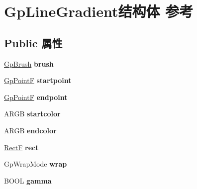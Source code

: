 \hypertarget{struct_gp_line_gradient}{}\section{Gp\+Line\+Gradient结构体 参考}
\label{struct_gp_line_gradient}
\subsection*{Public 属性}
\begin{DoxyCompactItemize}
\item 
\mbox{\label{struct_gp_line_gradient_a28aa8d5289ac0bff827221c8bc3e55b4}} 
\hyperlink{struct_gp_brush}{Gp\+Brush} {\bfseries brush}
\item 
\mbox{\label{struct_gp_line_gradient_adc33f6ca7d835a5e0e26cc53817ecd7a}} 
\hyperlink{struct_point_f}{Gp\+PointF} {\bfseries startpoint}
\item 
\mbox{\label{struct_gp_line_gradient_ab4b2ee569e849b8cd26f9667477e43f3}} 
\hyperlink{struct_point_f}{Gp\+PointF} {\bfseries endpoint}
\item 
\mbox{\label{struct_gp_line_gradient_a1e0d3305bffcd0153100de3f224747f1}} 
A\+R\+GB {\bfseries startcolor}
\item 
\mbox{\label{struct_gp_line_gradient_a702865740e0296a9bdbb5b24c5e80610}} 
A\+R\+GB {\bfseries endcolor}
\item 
\mbox{\label{struct_gp_line_gradient_aa761b16c5ec44a529621044eb4f4d678}} 
\hyperlink{struct_rect_f}{RectF} {\bfseries rect}
\item 
\mbox{\label{struct_gp_line_gradient_ac51f2874dc1eecb773192e9f8756709a}} 
Gp\+Wrap\+Mode {\bfseries wrap}
\item 
\mbox{\label{struct_gp_line_gradient_a4ff8a1aac206058339aca46bc36239a5}} 
B\+O\+OL {\bfseries gamma}
\item 
\mbox{\label{struct_gp_line_gradient_a84fe3f78d207ff524aaf7c31f3064a19}} 

\end{DoxyCompactItemize}
